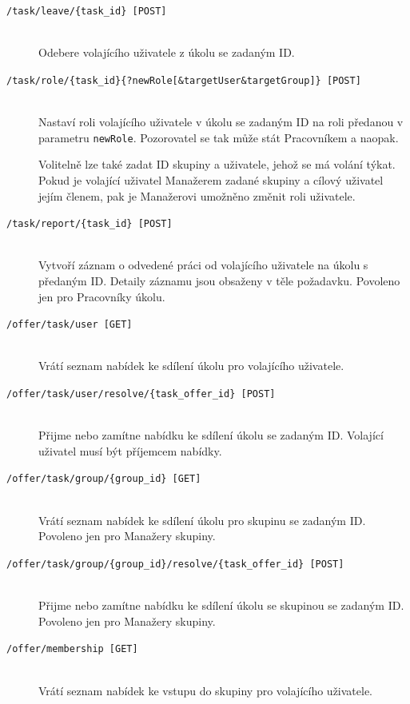 \documentclass[thesis=B,czech]{FITthesis}[2012/06/26]
\newcommand{\forworkers}{Povoleno jen pro Pracovníky úkolu.}
\newcommand{\formanagers}{Povoleno jen pro Manažery skupiny.}
\begin{document}
\begin{description}
			\item[\texttt{/task/leave/\{task\_id\} [POST]}] \hfill \\
				Odebere volajícího uživatele z úkolu se zadaným ID. 
			
			\item[\texttt{/task/role/\{task\_id\}\{?newRole[\&targetUser\&targetGroup]\} [POST]}] \hfill \\
				Nastaví roli volajícího uživatele v úkolu se zadaným ID na roli předanou v parametru \texttt{newRole}. Pozorovatel se tak může stát Pracovníkem a naopak. 
				
				Volitelně lze také zadat ID skupiny a uživatele, jehož se má volání týkat. Pokud je volající uživatel Manažerem zadané skupiny a cílový uživatel jejím členem, pak je Manažerovi umožněno změnit roli uživatele.
			
			\item[\texttt{/task/report/\{task\_id\} [POST]}] \hfill \\
				Vytvoří záznam o odvedené práci od volajícího uživatele na úkolu s předaným ID. Detaily záznamu jsou obsaženy v těle požadavku. \forworkers
				
			\item[\texttt{/offer/task/user [GET]}] \hfill \\
				Vrátí seznam nabídek ke sdílení úkolu pro volajícího uživatele.
			
			\item[\texttt{/offer/task/user/resolve/\{task\_offer\_id\} [POST]}] \hfill \\
				Přijme nebo zamítne nabídku ke sdílení úkolu se zadaným ID. Volající uživatel musí být příjemcem nabídky.
				
			\item[\texttt{/offer/task/group/\{group\_id\} [GET]}] \hfill \\
				Vrátí seznam nabídek ke sdílení úkolu pro skupinu se zadaným ID. \formanagers
			
			\item[\texttt{/offer/task/group/\{group\_id\}/resolve/\{task\_offer\_id\} [POST]}] \hfill \\
				Přijme nebo zamítne nabídku ke sdílení úkolu se skupinou se zadaným ID. \formanagers
			
			\item[\texttt{/offer/membership [GET]}] \hfill \\
				Vrátí seznam nabídek ke vstupu do skupiny pro volajícího uživatele.
			

\end{description}
\end{document}
